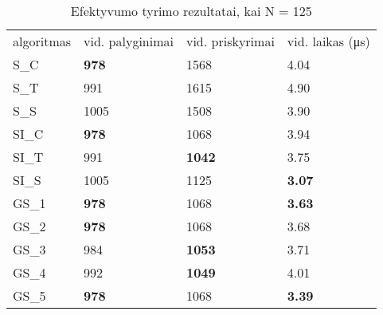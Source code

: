 \documentclass{VUMIFInfKursinis}
\begin{document}
\begin{table}[H]
  \caption{Efektyvumo tyrimo rezultatai, kai N = 125}
  \label{results_125}
  \centering
  \begin{tabular}{@{}llll@{}}
  algoritmas & vid. palyginimai                     & vid. priskyrimai                      & vid. laikas (μs)                      \\
  S\_C       & \cellcolor[HTML]{70AD47}\textbf{978} & 1568                                  & 4.04                                  \\
  S\_T       & 991                                  & 1615                                  & 4.90                                  \\
  S\_S       & 1005                                 & 1508                                  & 3.90                                  \\
  SI\_C      & \cellcolor[HTML]{70AD47}\textbf{978} & 1068                                  & 3.94                                  \\
  SI\_T      & 991                                  & \cellcolor[HTML]{70AD47}\textbf{1042} & 3.75                                  \\
  SI\_S      & 1005                                 & 1125                                  & \cellcolor[HTML]{70AD47}\textbf{3.07} \\
  GS\_1      & \cellcolor[HTML]{70AD47}\textbf{978} & 1068                                  & \cellcolor[HTML]{70AD47}\textbf{3.63} \\
  GS\_2      & \cellcolor[HTML]{70AD47}\textbf{978} & 1068                                  & 3.68                                  \\
  GS\_3      & 984                                  & \cellcolor[HTML]{70AD47}\textbf{1053} & 3.71                                  \\
  GS\_4      & 992                                  & \cellcolor[HTML]{70AD47}\textbf{1049} & 4.01                                  \\
  GS\_5      & \cellcolor[HTML]{70AD47}\textbf{978} & 1068                                  & \cellcolor[HTML]{70AD47}\textbf{3.39}
  \end{tabular}
\end{table}
\end{document}

